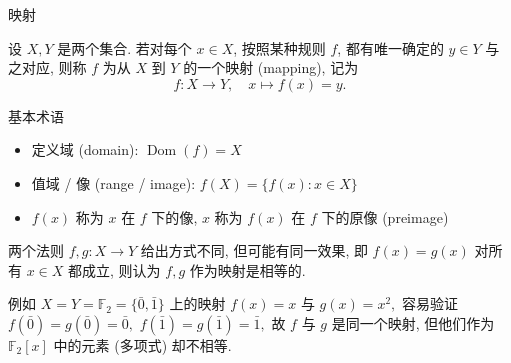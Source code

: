 
\begin{frame}{映射}

\begin{Def}[映射]
设 $X, Y$ 是两个集合. 若对每个 $x \in X$, 按照某种规则 $f$, 都有唯一确定的 $y \in Y$ 与之对应, 则称 $f$ 为从 $X$ 到 $Y$ 的一个\alert{映射} (mapping), 记为
\[
f: X \to Y, \quad x \mapsto f(x) = y.
\]
\end{Def}

\pause

\begin{block}{基本术语}
\begin{itemize}
  \item \alert{定义域} (domain): $\operatorname{Dom}(f) = X$
  \item \alert{值域} / \alert{像} (range / image): $f(X) = \{ f(x) : x \in X \}$
  \item $f(x)$ 称为 $x$ 在 $f$ 下的\alert{像}, $x$ 称为 $f(x)$ 在 $f$ 下的\alert{原像} (preimage)
\end{itemize}
\end{block}

\pause

\begin{remark}
两个法则 $f, g: X \to Y$ 给出方式不同, 但可能有同一效果, 即 $f(x) = g(x)$ 对所有 $x \in X$ 都成立, 则认为 $f, g$ 作为映射是\alert{相等}的.

\pause

例如 $X = Y = \mathbb{F}_2 = \{\bar{0}, \bar{1}\}$ 上的映射 $f(x) = x$ 与 $g(x) = x^2,$ 容易验证 $f(\bar0) = g(\bar{0}) = \bar{0},$ $f(\bar{1}) = g(\bar{1}) = \bar{1},$ 故 $f$ 与 $g$ 是同一个映射, 但他们作为 $\mathbb{F}_2[x]$ 中的元素 (多项式) 却不相等.
\end{remark}

\end{frame}


